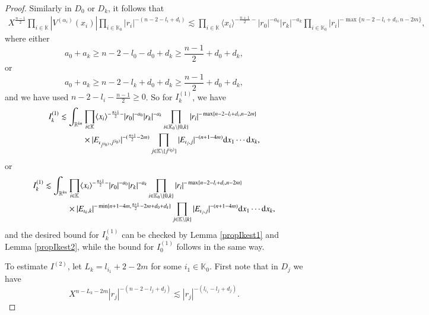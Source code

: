 \documentclass[11pt,reqno]{amsart}
\def\d{{\rm d}}
\numberwithin{equation}{section}
\theoremstyle{definition}
\begin{document}
\begin{proof}
	Similarly in $D_0$ or $D_k$, it follows that
	\begin{equation*}
		\begin{split}
			X^\frac{n-1}{2}\prod_{i\in\mathbb{K}}|V^{(\alpha_i)}(x_i)|\prod_{i\in\mathbb{K}_0}|r_i|^{-(n-2-l_i+d_i)}\lesssim\prod_{i\in\mathbb{K}}\langle x_i\rangle^{-\frac{n+1}{2}-}|r_0|^{-a_0}|r_k|^{-a_k}\prod_{i\in\mathbb{K}_0}|r_i|^{-\max\{n-2-l_i+d_i,n-2m\}},
		\end{split}
	\end{equation*}
	where either
	\begin{equation*}
		a_0+a_k\geq n-2-l_0-d_0+d_k\geq\mbox{$\frac{n-1}{2}$}+d_0+d_k,
	\end{equation*}
	or
	\begin{equation*}
		a_0+a_k\geq n-2-l_k+d_0+d_k\geq\mbox{$\frac{n-1}{2}$}+d_0+d_k,
	\end{equation*}
	and we have used $n-2-l_i-\frac{n-1}{2}\geq0$. So for $I^{(1)}_k$, we have
	\begin{equation*}
		\begin{split}
			I^{(1)}_k\lesssim\int_{\mathbb{R}^{kn}}&\prod_{i\in\mathbb{K}}\langle x_i\rangle^{-\frac{n+1}{2}-}|r_0|^{-a_0}|r_k|^{-a_k}\prod_{i\in\mathbb{K}_0\setminus\{0,k\}}|r_i|^{-\max\{n-2-l_i+d_i,n-2m\}}\\
			&\times|E_{\iota_{j^{(i_0)}},j^{(i_0)}}|^{-(\frac{n+1}{2}-2m)}\prod_{j\in\mathbb{K}\setminus\{j^{(i_0)}\}}|E_{\iota_j,j}|^{-(n+1-4m)}\d x_1\cdots\d x_k,
		\end{split}
	\end{equation*}
	or
	\begin{equation*}
		\begin{split}
			I^{(1)}_k\lesssim\int_{\mathbb{R}^{kn}}&\prod_{i\in\mathbb{K}}\langle x_i\rangle^{-\frac{n+1}{2}-}|r_0|^{-a_0}|r_k|^{-a_k}\prod_{i\in\mathbb{K}_0\setminus\{0,k\}}|r_i|^{-\max\{n-2-l_i+d_i,n-2m\}}\\
			&\times|E_{\iota_k,k}|^{-\min\{n+1-4m,\frac{n+1}{2}-2m+d_0+d_k\}}\prod_{j\in\mathbb{K}\setminus\{k\}}|E_{\iota_j,j}|^{-(n+1-4m)}\d x_1\cdots\d x_k,
		\end{split}
	\end{equation*}
	and the desired bound for $I^{(1)}_k$ can be checked by Lemma \ref{propIkest1} and Lemma \ref{propIkest2}, while the bound for $I^{(1)}_0$ follows in the same way.
	
	
	To estimate $I^{(2)}$, let $L_k=l_{i_1}+2-2m$ for some $i_1\in\mathbb{K}_0$. First note that in $D_j$ we have
	\begin{equation*}
		X^{n-L_k-2m}|r_j|^{-(n-2-l_j+d_j)}\lesssim|r_j|^{-(l_{i_1}-l_j+d_j)}.
	\end{equation*}
	

\end{proof}
\end{document}
